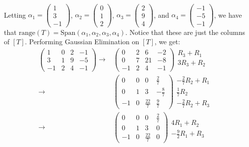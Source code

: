 \documentclass[12pt]{article}
\newenvironment{problem}[2][Problem]
{
	\begin{trivlist} 
		\item[\hskip \labelsep {\bfseries #1 #2:}]
	}
{
	\end{trivlist}
	}
\newenvironment{solution}[1][Solution]
{
	\begin{trivlist} 
		\item[\hskip \labelsep {\itshape #1:}]
	}
	{
	\end{trivlist}
}
\begin{document}
\begin{problem}{4}
\begin{solution}
\begin{align*}
\end{align*}
Letting $\alpha_1 =\begin{pmatrix} 1\\3\\-1 \end{pmatrix}$, $\alpha_2 =\begin{pmatrix} 0\\1\\2 \end{pmatrix}$, $\alpha_3 =\begin{pmatrix} 2\\9\\4 \end{pmatrix}$, and $\alpha_4 =\begin{pmatrix} -1\\-5\\-1 \end{pmatrix}$, we have that $\text{range}(T)=\text{Span}(\alpha_1, \alpha_2, \alpha_3, \alpha_4)$. Notice that these are just the columns of $[T]$. Performing Gaussian Elimination on $[T]$, we get:
\begin{align*}
\begin{pmatrix} 1&0&2&-1\\3&1&9&-5\\-1&2&4&-1 \end{pmatrix} \rightarrow& \begin{pmatrix} 0&2&6&-2\\0&7&21&-8\\-1&2&4&-1 \end{pmatrix} \begin{matrix} R_3+R_1\text{ } \\ 3R_3+R_2\text{ } \\ \text{ } \end{matrix}\\
\rightarrow& \begin{pmatrix} 0&0&0&\frac{2}{7}\\0&1&3&-\frac{8}{7}\\-1&0&\frac{22}{7}&\frac{9}{7} \end{pmatrix} \begin{matrix} -\frac{2}{7}R_2 + R_1 \text{ } \\ \frac{1}{7}R_2\text{ } \\ -\frac{2}{7}R_2 + R_3\text{ } \end{matrix}\\
\rightarrow& \begin{pmatrix} 0&0&0&\frac{2}{7}\\0&1&3&0\\-1&0&\frac{22}{7}&0 \end{pmatrix} \begin{matrix} \text{ } \\ 4R_1+R_2\text{ } \\ -\frac{9}{2}R_1 + R_3\text{ } \end{matrix}\\

\end{align*}
\end{solution}
\end{problem}
\end{document}
